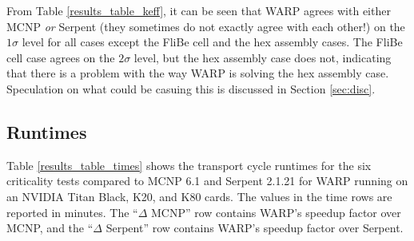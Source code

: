 \documentclass[preprint,12pt]{elsarticle}
\begin{document}
From Table \ref{results_table_keff}, it can be seen that WARP agrees with either MCNP \emph{or} Serpent (they sometimes do not exactly agree with each other!) on the $1\sigma$ level for all cases except the FliBe cell and the hex assembly cases.  The FliBe cell case agrees on the $2\sigma$ level, but the hex assembly case does not, indicating that there is a problem with the way WARP is solving the hex assembly case.  Speculation on what could be casuing this is discussed in Section \ref{sec:disc}.

\newpage
\subsection{Runtimes}


Table \ref{results_table_times} shows the transport cycle runtimes for the six criticality tests compared to MCNP 6.1 and Serpent 2.1.21 for WARP running on an NVIDIA Titan Black, K20, and K80 cards.  The values in the time rows are reported in minutes.  The ``$\Delta$ MCNP'' row contains WARP's speedup factor over MCNP, and the ``$\Delta$ Serpent'' row contains WARP's speedup factor over Serpent.
\end{document}
